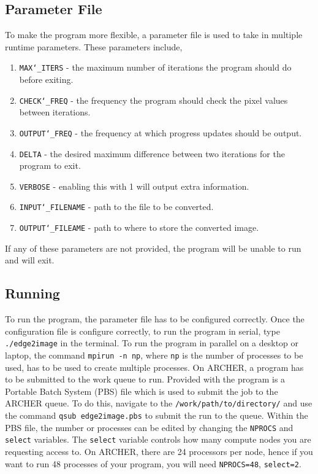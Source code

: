 \documentclass[11pt, a4paper]{article}
\begin{document}
		\subsection{Parameter File}
			To make the program more flexible, a parameter file is used to take in multiple runtime parameters. These parameters include,
				
				\begin{enumerate}
					\item \texttt{MAX\char`_ITERS} - the maximum number of iterations the program should do before exiting.
					\item \texttt{CHECK\char`_FREQ} - the frequency the program should check the pixel values between iterations.
					\item \texttt{OUTPUT\char`_FREQ} - the frequency at which progress updates should be output.
					\item \texttt{DELTA} - the desired maximum difference between two iterations for the program to exit.
					\item \texttt{VERBOSE} - enabling this with 1 will output extra information.
					\item \texttt{INPUT\char`_FILENAME} - path to the file to be converted.
					\item \texttt{OUTPUT\char`_FILEAME} - path to where to store the converted image.
				\end{enumerate}
			
			\noindent If any of these parameters are not provided, the program will be unable to run and will exit. 
	
		\subsection{Running}
			To run the program, the parameter file has to be configured correctly. Once the configuration file is configure correctly, to run the program in serial, type \texttt{./edge2image} in the terminal. To run the program in parallel on a desktop or laptop, the command \texttt{mpirun -n np}, where \texttt{np} is the number of processes to be used, has to be used to create multiple processes. On ARCHER, a program has to be submitted to the work queue to run. Provided with the program is a Portable Batch System (PBS) file which is used to submit the job to the ARCHER queue. To do this, navigate to the \texttt{/work/path/to/directory/} and use the command \texttt{qsub edge2image.pbs} to submit the run to the queue. Within the PBS file, the number or processes can be edited by changing the \texttt{NPROCS} and \texttt{select} variables. The \texttt{select} variable controls how many compute nodes you are requesting access to. On ARCHER, there are 24 processors per node, hence if you want to run 48 processes of your program, you will need \texttt{NPROCS=48}, \texttt{select=2}.
			
\end{document}
